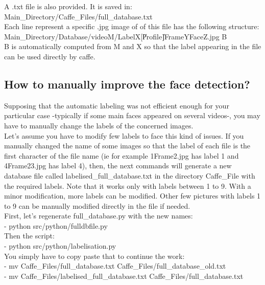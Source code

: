 A .txt file is also provided. It is saved in:\\

Main\_Directory/Caffe\_Files/full\_database.txt\\

Each line represent a specific .jpg image of of this file has the following structure:\\

Main\_Directory/Database/videoM/LabelX[\|Profile\|]FrameYFaceZ.jpg B\\

B is automatically computed from M and X so that the label appearing in the file can be used directly by caffe.

\subsection{How to manually improve the face detection?}

Supposing that the automatic labeling was not efficient enough for your particular case -typically if some main faces appeared on several videos-, you may have to manually change the labels of the concerned images.\\

Let’s assume you have to modify few labels to face this kind of issues. If you manually changed the name of some images so that the label of each file is the first character of the file name (ie for example 1Frame2.jpg has label 1 and 4Frame23.jpg has label 4), then, the next commands will generate a new database file called labelised\_full\_database.txt in the directory Caffe\_File with the required labels. Note that it works only with labels between 1 to 9. With a minor modification, more labels can be modified. Other few pictures with labels 1 to 9 can be manually modified directly in the file if needed.\\


First, let’s regenerate full\_database.py with the new names:\\
- python src/python/fulldbfile.py\\

Then the script:\\
- python src/python/labelisation.py\\

You simply have to copy paste that to continue the work: \\

- mv Caffe\_Files/full\_database.txt Caffe\_Files/full\_database\_old.txt\\
- mv Caffe\_Files/labelised\_full\_database.txt Caffe\_Files/full\_database.txt

